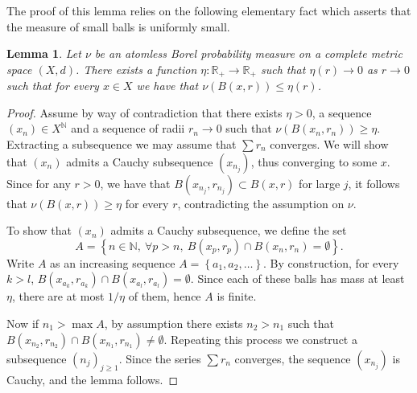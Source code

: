 \documentclass[10pt]{amsart}
\newtheorem{lemm}[theo]{Lemma}\newtheorem{prop}[theo]{Proposition}\newtheorem{coro}[theo]{Corollary}\newtheorem{conj}[theo]{Conjecture}
\theoremstyle{definition}\newtheorem{defi}[theo]{Definition}\newtheorem{rema}[theo]{Remark}\newtheorem{exam}[theo]{Example}\newtheorem{exem}[theo]{Example}\newtheorem{nota}[theo]{Notation}
\newcommand{\nn}{\mathbb{N}}
\newcommand{\R}{{\mathbb R}}
\newcommand{\cv}{\rightarrow}
\newcommand{\set}[1]{\left\{#1\right\}}
\let\oldforall\forall
\renewcommand*{\forall}{\mathrel{\oldforall}}
\begin{document}
The proof of this lemma relies on the following elementary fact which asserts that the measure of small balls is uniformly small.

\begin{lemm}\label{lem:uniform}
Let $\nu$ be an atomless Borel probability measure on a complete metric space $(X,d)$. There exists a function $\eta : \R_+ \to \R_+$ such that $\eta(r)\to 0$ as $r\to 0$ such that for every $x\in X$ we have that $\nu(B(x,r))\leq \eta(r)$.
\end{lemm}

\goodbreak
\begin{proof}
Assume by way of contradiction that there exists $\eta>0$, a sequence $(x_n)\in X^\nn$ and a sequence of radii $r_n\cv 0$ such that $\nu(B(x_n, r_n))\geq \eta$. Extracting a subsequence we may assume that $\sum r_n$ converges. We will show that $(x_n)$ admits a Cauchy subsequence $(x_{n_j})$, thus converging to some $x$. Since for any $r>0$, we have that $B(x_{n_j}, r_{n_j}) \subset B(x, r)$ for large $j$, it follows that $\nu (B(x,r))\geq \eta$ for every $r$, contradicting the assumption on $\nu$.

To show that $(x_n)$ admits a Cauchy subsequence, we define the set
\[
A = \set{n\in \nn,\ \forall p>n, \ B(x_p, r_p) \cap B(x_n, r_n) = \emptyset}.
\]
Write $A$ as an increasing sequence $A = \set{a_1, a_2, \ldots}$. By construction, for every $k>l$, $B(x_{a_k}, r_{a_k}) \cap B(x_{a_l}, r_{a_l}) = \emptyset$. Since each of these balls has mass at least $ \eta$, there are at most $1/\eta$ of them, hence $A$ is finite.

Now if $n_1> \max A$, by assumption there exists $n_2>n_1$ such that $B(x_{n_2}, r_{n_2})\cap B(x_{n_1}, r_{n_1})\neq \emptyset$. Repeating this process we construct a subsequence $(n_j)_{j\geq 1}$. Since the series $\sum r_n$ converges, the sequence $(x_{n_j})$ is Cauchy, and the lemma follows.
\end{proof}
\end{document}
